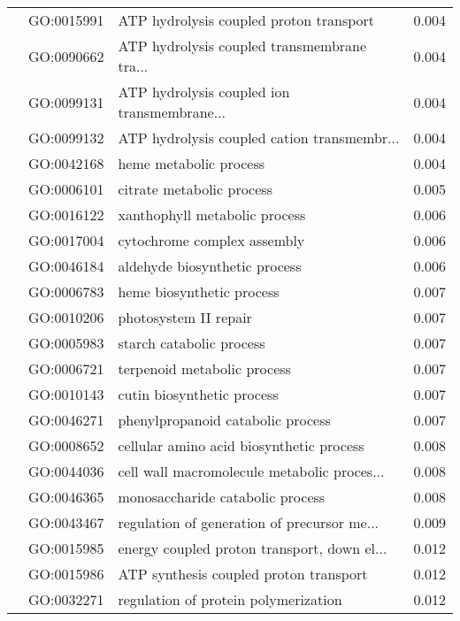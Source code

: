 \begin{longtable}{lllr}
   & GO:0015991 &      ATP hydrolysis coupled proton transport &         0.004 \\
   & GO:0090662 &  ATP hydrolysis coupled transmembrane tra... &         0.004 \\
   & GO:0099131 &  ATP hydrolysis coupled ion transmembrane... &         0.004 \\
   & GO:0099132 &  ATP hydrolysis coupled cation transmembr... &         0.004 \\
   & GO:0042168 &                       heme metabolic process &         0.004 \\
   & GO:0006101 &                    citrate metabolic process &         0.005 \\
   & GO:0016122 &                xanthophyll metabolic process &         0.006 \\
   & GO:0017004 &                  cytochrome complex assembly &         0.006 \\
   & GO:0046184 &                aldehyde biosynthetic process &         0.006 \\
   & GO:0006783 &                    heme biosynthetic process &         0.007 \\
   & GO:0010206 &                        photosystem II repair &         0.007 \\
   & GO:0005983 &                     starch catabolic process &         0.007 \\
   & GO:0006721 &                  terpenoid metabolic process &         0.007 \\
   & GO:0010143 &                   cutin biosynthetic process &         0.007 \\
   & GO:0046271 &            phenylpropanoid catabolic process &         0.007 \\
   & GO:0008652 &     cellular amino acid biosynthetic process &         0.008 \\
   & GO:0044036 &  cell wall macromolecule metabolic proces... &         0.008 \\
   & GO:0046365 &             monosaccharide catabolic process &         0.008 \\
   & GO:0043467 &  regulation of generation of precursor me... &         0.009 \\
   & GO:0015985 &  energy coupled proton transport, down el... &         0.012 \\
   & GO:0015986 &       ATP synthesis coupled proton transport &         0.012 \\
   & GO:0032271 &         regulation of protein polymerization &         0.012 \\

\end{longtable}
